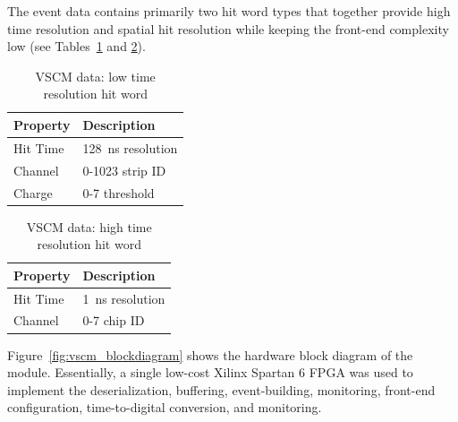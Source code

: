 The event data contains primarily two hit word types that together provide high time resolution and spatial hit resolution
while keeping the front-end complexity low (see Tables~\ref{tab:vscm_low_res} and \ref{tab:vscm_high_res}).
\begin{table}
\begin{center}
	\begin{tabular}{| l | l |}
		\hline \hline
		Property	& Description		\\
		\hline
		Hit Time	& 128~ns resolution	\\
		Channel		& 0-1023 strip ID	\\
		Charge		& 0-7 threshold		\\
		\hline \hline
	\end{tabular}
	\caption{VSCM data: low time resolution hit word}
	\label{tab:vscm_low_res}
\end{center}
\end{table}

\begin{table}
\begin{center}
	\begin{tabular}{| l | l |}
		\hline \hline
		Property	& Description		\\
		\hline
		Hit Time	& 1~ns resolution	\\
		Channel		& 0-7 chip ID		\\
		\hline \hline
	\end{tabular}
	\caption{VSCM data: high time resolution hit word}
	\label{tab:vscm_high_res}
\end{center}
\end{table}

Figure~\ref{fig:vscm_blockdiagram} shows the hardware block diagram of the module. Essentially, a single low-cost
Xilinx Spartan 6 FPGA was used to implement the deserialization, buffering, event-building, monitoring, front-end
configuration, time-to-digital conversion, and monitoring.

